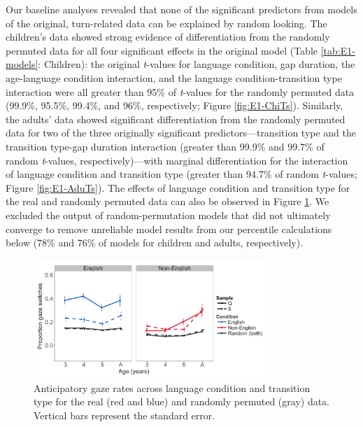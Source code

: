 \documentclass[authoryear, 12pt]{elsarticle}
\begin{document}
Our baseline analyses revealed that none of the significant predictors from models of the original, turn-related data can be explained by random looking. The children's data showed strong evidence of differentiation from the randomly permuted data for all four significant effects in the original model (Table \ref{tab:E1-models}: Children):  the original \textit{t}-values for language condition, gap duration, the age-language condition interaction, and the language condition-transition type interaction were all greater than 95\% of \textit{t}-values for the randomly permuted data (99.9\%, 95.5\%, 99.4\%, and 96\%, respectively; Figure \ref{fig:E1-ChiTs}). Similarly, the adults' data showed significant differentiation from the randomly permuted data for two of the three originally significant predictors---transition type and the transition type-gap duration interaction (greater than 99.9\% and 99.7\% of random \textit{t}-values, respectively)---with marginal differentiation for the interaction of language condition and transition type (greater than 94.7\% of random \textit{t}-values; Figure \ref{fig:E1-AduTs}). The effects of language condition and transition type for the real and randomly permuted data can also be observed in Figure \ref{fig:E1-randvsreal}. We excluded the output of random-permutation models that did not ultimately converge to remove unreliable model results from our percentile calculations below (78\% and 76\% of models for children and adults, respectively). 

\begin{figure}[h]
\begin{center}
\includegraphics[width=0.8\textwidth]{figures/E1-samples-by-lang-groups-trans-types.png}
\end{center}
\caption{Anticipatory gaze rates across language condition and transition type for the real (red and blue) and randomly permuted (gray) data. Vertical bars represent the standard error.} 
\label{fig:E1-randvsreal}
\end{figure}
\end{document}

